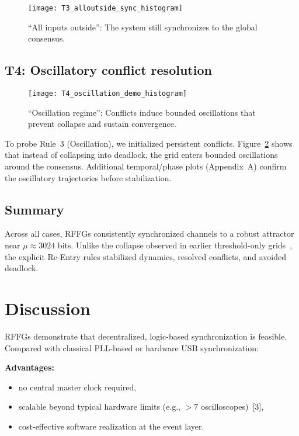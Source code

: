 \documentclass[11pt]{article}
\begin{document}
\begin{figure}[htbp!]
  \centering
  \texttt{[image: T3\_alloutside\_sync\_histogram]}
  \caption{\enquote{All inputs outside}: The system still synchronizes to the global consensus.}
  \label{fig:T3_hist}
\end{figure}

\subsection*{T4: Oscillatory conflict resolution}
\begin{figure}[htbp!]
  \centering
  \texttt{[image: T4\_oscillation\_demo\_histogram]}
  \caption{\enquote{Oscillation regime}: Conflicts induce bounded oscillations that prevent collapse and sustain convergence.}
  \label{fig:T4_hist}
\end{figure}
To probe Rule~3 (Oscillation), we initialized persistent conflicts.  
Figure~\ref{fig:T4_hist} shows that instead of collapsing into deadlock, the grid enters bounded oscillations around the consensus. Additional temporal/phase plots (Appendix~A) confirm the oscillatory trajectories before stabilization.


\subsection*{Summary}
Across all cases, RFFGs consistently synchronized channels to a robust attractor near $\mu \approx 3024$ bits. Unlike the collapse observed in earlier threshold-only grids~\cite{lba2025}, the explicit Re-Entry rules stabilized dynamics, resolved conflicts, and avoided deadlock.

\section{Discussion}
RFFGs demonstrate that decentralized, logic-based synchronization is feasible. Compared with classical PLL-based or hardware USB synchronization:

\textbf{Advantages:}
\begin{itemize}
  \item no central master clock required,
  \item scalable beyond typical hardware limits (e.g., $>7$ oscilloscopes)~[3],
  \item cost-effective software realization at the event layer.
\end{itemize}
\end{document}
